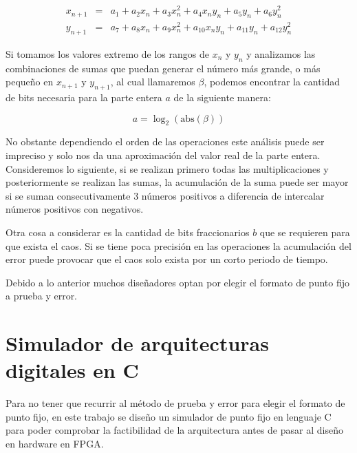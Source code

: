         \begin{equation*}
            \begin{array}{ccl}
                x_{n+1} & = &  a_{1} + a_{2}x_{n} + a_{3}x_{n}^{2} + a_{4}x_{n}y_{n} + a_{5}y_{n} + a_{6}y_{n}^{2}\\
                y_{n+1} & = &  a_{7} + a_{8}x_{n} + a_{9}x_{n}^{2} + a_{10}x_{n}y_{n} + a_{11}y_{n} + a_{12}y_{n}^{2}
            \end{array}
        \end{equation*}

        Si tomamos los valores extremo de los rangos de $x_{n}$ y $y_{n}$ y analizamos las combinaciones de sumas que puedan generar el número más grande, o más pequeño en $x_{n+1}$ y $y_{n+1}$, al cual llamaremos $\beta$, podemos encontrar la cantidad de bits necesaria para la parte entera $a$ de la siguiente manera:

        \begin{equation}
                a = \log_{2} ( \text{abs}( \beta ) )
            \label{eq:bits_enteros}
        \end{equation}

       No obstante dependiendo el orden de las operaciones este análisis puede ser impreciso y solo nos da una aproximación del valor real de la parte entera. Consideremos lo siguiente, si se realizan primero todas las multiplicaciones y posteriormente se realizan las sumas, la acumulación de la suma puede ser mayor si se suman consecutivamente 3 números positivos a diferencia de intercalar números positivos con negativos.
       
       Otra cosa a considerar es la cantidad de bits fraccionarios $b$ que se requieren para que exista el caos. Si se tiene poca precisión en las operaciones la acumulación del error puede provocar que el caos solo exista por un corto periodo de tiempo. 

       Debido a lo anterior muchos diseñadores optan por elegir el formato de punto fijo a prueba y error. 

    \section{Simulador de arquitecturas digitales en C}

        Para no tener que recurrir al método de prueba y error para elegir el formato de punto fijo, en este trabajo se diseño un simulador de punto fijo en lenguaje C para poder comprobar la factibilidad de la arquitectura antes de pasar al diseño en hardware en FPGA. 


